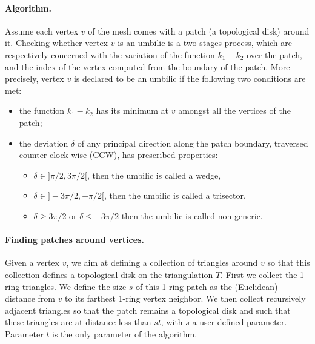 %

\paragraph{Algorithm.}
Assume each vertex $v$ of the mesh comes with a patch (a topological
disk) around it. Checking whether vertex $v$ is an umbilic is a two
stages process, which are respectively concerned with the variation
of the function $k_1-k_2$ over the patch, and the index of the vertex
computed from the boundary of the patch. More precisely, vertex $v$ is
declared to be an umbilic if the following two conditions are met:
\begin{itemize}
\item
the function $k_1-k_2$ has its minimum at $v$ amongst all the
vertices of the patch;
\item
the deviation $\delta$ of any principal direction along the patch
boundary, traversed counter-clock-wise (CCW), has prescribed
properties:
\begin{itemize}
\item
$\delta \in ]\pi/2,3\pi/2[$, then the umbilic is called a wedge,
\item
$\delta \in ]-3\pi/2,-\pi/2[$, then the umbilic is called a trisector,
\item
$\delta \geq 3\pi/2$ or $\delta \leq -3\pi/2$ then the umbilic is called non-generic.
\end{itemize}
\end{itemize}


\paragraph{Finding patches around vertices.}
Given a vertex $v$, we aim at defining a collection of triangles
around $v$ so that this collection defines a topological disk on the
triangulation $T$. First we collect the 1-ring triangles. We define
the size $s$ of this 1-ring patch as the (Euclidean) distance from $v$
to its farthest 1-ring vertex neighbor. We then collect recursively
adjacent triangles so that the patch remains a topological disk and
such that these triangles are at distance less than $st$, with $s$ a
user defined parameter. Parameter $t$ is the only parameter of the
algorithm.

